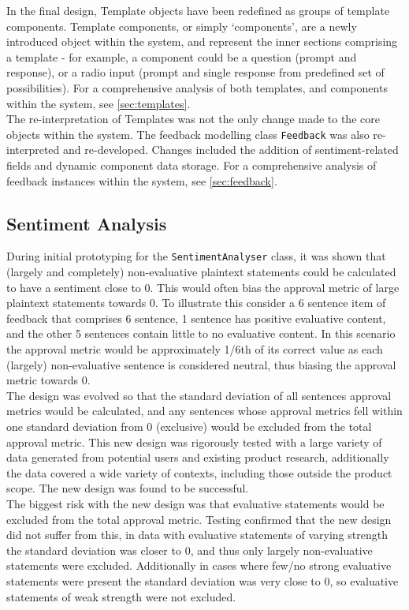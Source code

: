 \documentclass[9pt, titlepage]{extarticle}
\begin{document}
In the final design, Template objects have been redefined as groups of template components. Template components, or simply `components', are a newly introduced object within the system, and represent the inner sections comprising a template - for example, a component could be a question (prompt and response), or a radio input (prompt and single response from predefined set of possibilities). For a comprehensive analysis of both templates, and components within the system, see \autoref{sec:templates}. \\

The re-interpretation of Templates was not the only change made to the core objects within the system. The feedback modelling class \texttt{Feedback} was also re-interpreted and re-developed. Changes included the addition of sentiment-related fields and dynamic component data storage.  For a comprehensive analysis of feedback instances within the system, see \autoref{sec:feedback}. 


\subsection{Sentiment Analysis}
During initial prototyping for the \texttt{SentimentAnalyser} class, it was shown that (largely and completely) non-evaluative plaintext statements could be calculated to have a sentiment close to 0. This would often bias the approval metric of large plaintext statements towards 0. To illustrate this consider a 6 sentence item of feedback that comprises 6 sentence, 1 sentence has positive evaluative content, and the other 5 sentences contain little to no evaluative content. In this scenario the approval metric would be approximately 1/6th of its correct value as each (largely) non-evaluative sentence is considered neutral, thus biasing the approval metric towards 0.\\

The design was evolved so that the standard deviation of all sentences approval metrics would be calculated, and any sentences whose approval metrics fell within one standard deviation from 0 (exclusive) would be excluded from the total approval metric. This new design was rigorously tested with a large variety of data generated from potential users and existing product research, additionally the data covered a wide variety of contexts, including those outside the product scope. The new design was found to be successful.\\

The biggest risk with the new design was that evaluative statements would be excluded from the total approval metric. Testing confirmed that the new design did not suffer from this, in data with evaluative statements of varying strength the standard deviation was closer to 0, and thus only largely non-evaluative statements were excluded. Additionally in cases where few/no strong evaluative statements were present the standard deviation was very close to 0, so evaluative statements of weak strength were not excluded.\\
\end{document}

